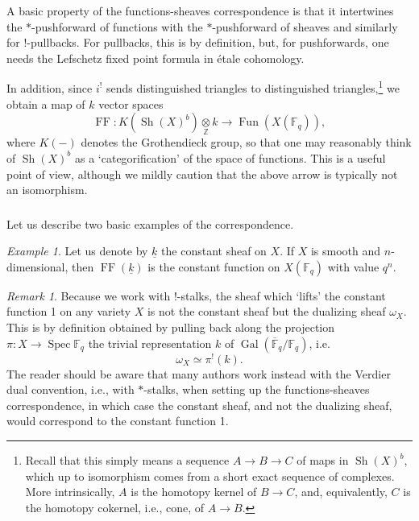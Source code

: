 \documentclass[10pt]{amsart}
\newcommand{\on}{\operatorname}
\newcommand{\Fq}{\mathbb{F}_q}
\newcommand{\Fun}{\on{Fun}}
\theoremstyle{remark}
\newtheorem{re}[subsubsection]{Remark}
\newtheorem{ex}[subsubsection]{Example}
\numberwithin{equation}{section}
\begin{document}
	
	\subsubsection{} A basic property of the functions-sheaves correspondence 
	is that it intertwines the $*$-pushforward of functions with the $*$-pushforward of 
	sheaves and similarly for $!$-pullbacks. For pullbacks, this is by 
	definition, but, for pushforwards, one needs the Lefschetz fixed point 
	formula in \'{e}tale cohomology. 
	
	In addition, since $i^!$ sends distinguished triangles to distinguished 
	triangles,\footnote{Recall that this simply means a sequence $A \rightarrow B 
	\rightarrow C$ of maps in $\on{Sh}(X)^b$, which up to isomorphism comes 
	from a short exact sequence of complexes. More intrinsically,  
	$A$ is the homotopy kernel of $B \rightarrow C$, and, equivalently, $C$ is the 
	homotopy cokernel, i.e., cone, of $A \rightarrow B$.} we obtain a map of 
	$k$ vector spaces 
	\[
	\on{FF}: K( \on{Sh}(X)^b) \underset{\mathbb{Z}}{\otimes} k \rightarrow 
	\Fun(X(\Fq)),
	\]
	where $K(-)$ denotes the Grothendieck group, so that one may reasonably 
	think of $\on{Sh}(X)^b$ as a `categorification' of the space of functions. 
	This is a useful point of view, although we mildly caution that the above 
	arrow is typically not an isomorphism. 
	
	\subsubsection{} 
	
	Let us describe two basic examples of the correspondence. 
	
	\begin{ex} Let us denote by $\underline{k}$ the constant sheaf on $X$. If 
	$X$ is smooth and $n$-dimensional, then $\on{FF}(\underline{k})$ is the 
	constant function on $X(\Fq)$ with value $q^{n}$. \end{ex}
	
	\begin{re} Because we work with $!$-stalks, the sheaf which `lifts' the 
	constant function 1 on any variety $X$ is not the constant sheaf but the 
	dualizing sheaf $\omega_X$. This is by definition obtained by pulling back along the projection $\pi: X \rightarrow \on{Spec} \mathbb{F}_q$ the trivial representation $k$ of $\on{Gal}(\overline{\mathbb{F}}_q / \mathbb{F}_q)$, i.e. $$\omega_X \simeq \pi^!(k).$$ The reader should be aware that many authors work instead with the Verdier dual convention, i.e., with $*$-stalks, when setting up the functions-sheaves correspondence, in which case the constant sheaf, and not the dualizing sheaf, would correspond to the constant function 1. \end{re}
	
\end{document}
